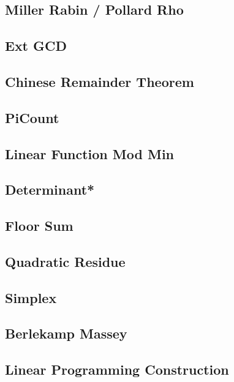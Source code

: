 \subsection{Miller Rabin / Pollard Rho}
\subsection{Ext GCD}

\subsection{Chinese Remainder Theorem} %

\subsection{PiCount}
\subsection{Linear Function Mod Min} 
\subsection{Determinant*}
\subsection{Floor Sum}
\subsection{Quadratic Residue}
\subsection{Simplex}
\subsection{Berlekamp Massey}
\subsection{Linear Programming Construction}

